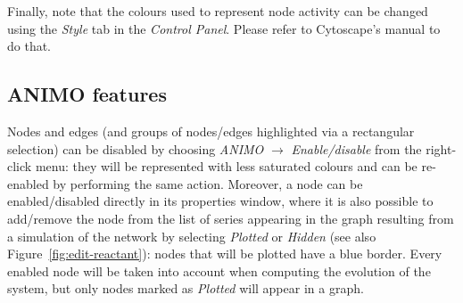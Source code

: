 \documentclass{article}
\begin{document}
Finally, note that the colours used to represent node activity can be changed using the \emph{Style} tab
in the \emph{Control Panel}. Please refer to Cytoscape's manual to do that.
% 


\subsection{ANIMO features}
Nodes and edges (and groups of nodes/edges highlighted via a rectangular selection)
can be disabled by choosing \emph{ANIMO} $\rightarrow$ \emph{Enable/disable} from
the right-click menu: they will be represented with less saturated colours and can be re-enabled by performing
the same action. Moreover, a node can be enabled/disabled directly in its properties window, where it is
also possible to add/remove the node from the list of series appearing in the graph resulting from a simulation
of the network by selecting \emph{Plotted} or \emph{Hidden} (see also Figure~\ref{fig:edit-reactant}):
nodes that will be plotted have a blue border.
Every enabled node will be taken into account when computing the evolution of the system,
but only nodes marked as \emph{Plotted} will appear in a graph.
\end{document}
